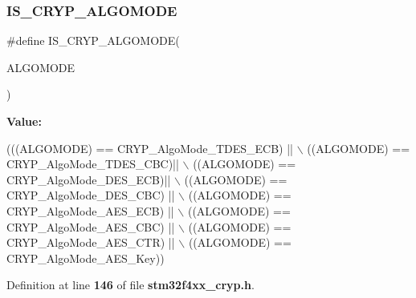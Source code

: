 \subsubsection{I\+S\+\_\+\+C\+R\+Y\+P\+\_\+\+A\+L\+G\+O\+M\+O\+DE}
{\footnotesize\ttfamily \#define I\+S\+\_\+\+C\+R\+Y\+P\+\_\+\+A\+L\+G\+O\+M\+O\+DE(\begin{DoxyParamCaption}\item[{}]{A\+L\+G\+O\+M\+O\+DE }\end{DoxyParamCaption})}

{\bfseries Value\+:}
\begin{DoxyCode}
(((ALGOMODE) == CRYP_AlgoMode_TDES_ECB) || \(\backslash\)
                                   ((ALGOMODE) == CRYP_AlgoMode_TDES_CBC)|| \(\backslash\)
                                   ((ALGOMODE) == CRYP_AlgoMode_DES_ECB)|| \(\backslash\)
                                   ((ALGOMODE) == CRYP_AlgoMode_DES_CBC) || \(\backslash\)
                                   ((ALGOMODE) == CRYP_AlgoMode_AES_ECB) || \(\backslash\)
                                   ((ALGOMODE) == CRYP_AlgoMode_AES_CBC) || \(\backslash\)
                                   ((ALGOMODE) == CRYP_AlgoMode_AES_CTR) || \(\backslash\)
                                   ((ALGOMODE) == CRYP_AlgoMode_AES_Key))
\end{DoxyCode}


Definition at line \textbf{ 146} of file \textbf{ stm32f4xx\+\_\+cryp.\+h}.

